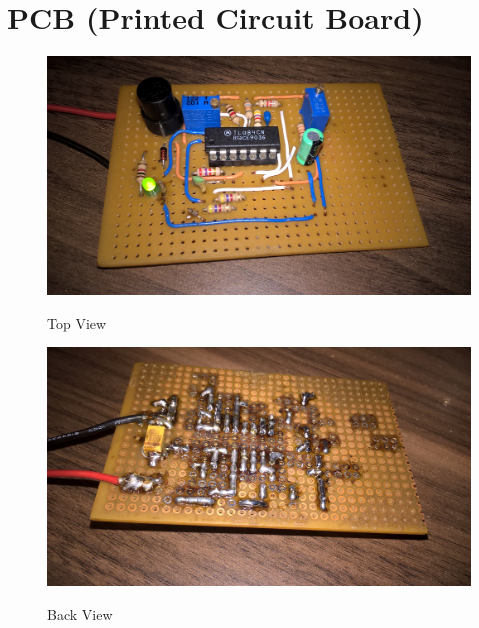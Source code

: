 \documentclass[titlepage, a4paper, 10pt, reqno, openany]{report}
\begin{document}
\section{PCB (Printed Circuit Board)}
\begin{figure}[H]
	\centering
	\includegraphics[scale=0.15]{./image/placa_1.jpg}\\
	\caption{Top View}
\end{figure}
\begin{figure}[H]
	\centering
	\includegraphics[scale=0.15]{./image/placa_2.jpg}\\
	\caption{Back View}
\end{figure}\par
\end{document}
